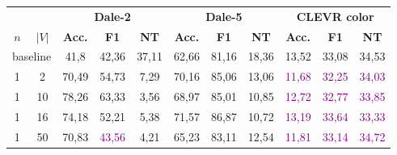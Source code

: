 \begin{table}[ht]
    \centering
    \begin{tabular}{cc|ccc|ccc|ccc}
        \toprule
                                      &        & \multicolumn{3}{c}{\textbf{Dale-2}} & \multicolumn{3}{c}{\textbf{Dale-5}} & \multicolumn{3}{c}{\textbf{CLEVR color}}                                                                                                                                                                         \\  \cmidrule(lr){3-5}\cmidrule(lr){6-8}\cmidrule(lr){9-11}
        $n$                           & $|V|$  & \textbf{Acc.}                       & \textbf{F1}                         & \textbf{NT}                              & \textbf{Acc.}             & \textbf{F1}               & \textbf{NT}               & \textbf{Acc.}             & \textbf{F1}               & \textbf{NT}               \\\midrule
        \multicolumn{2}{c|}{baseline} & {41,8} & {42,36}                             & {37,11}                             & {62,66}                                  & {81,16}                   & {18,36}                   & {13,52}                   & {33,08}                   & {34,53}                                               \\\midrule
        {1}                           & {2}    & {70,49}                             & {54,73}                             & {7,29}                                   & {70,16}                   & {85,06}                   & {13,06}                   & \textcolor{purple}{11,68} & \textcolor{purple}{32,25} & \textcolor{purple}{34,03} \\
        {1}                           & {10}   & {78,26}                             & {63,33}                             & {3,56}                                   & {68,97}                   & {85,01}                   & {10,85}                   & \textcolor{purple}{12,72} & \textcolor{purple}{32,77} & \textcolor{purple}{33,85} \\
        {1}                           & {16}   & {74,18}                             & {52,21}                             & {5,38}                                   & {71,57}                   & {86,87}                   & {10,72}                   & \textcolor{purple}{13,19} & \textcolor{purple}{33,64} & \textcolor{purple}{33,33} \\
        {1}                           & {50}   & {70,83}                             & \textcolor{purple}{43,56}           & {4,21}                                   & {65,23}                   & {83,11}                   & {12,54}                   & \textcolor{purple}{11,81} & \textcolor{purple}{33,14} & \textcolor{purple}{34,72} \\

\end{tabular}
\end{table}
